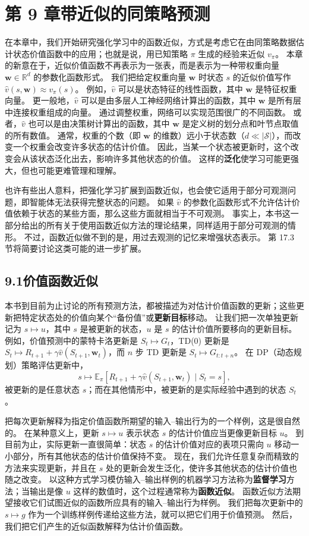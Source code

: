 \documentclass[UTF8, 12pt, fontset=fandol, oneside]{ctexart}
\begin{document}
\section*{第 9 章\quad 带近似的同策略预测}

在本章中，我们开始研究强化学习中的函数近似，方式是考虑它在由同策略数据估计状态价值函数中的应用；也就是说，用已知策略 $\pi$ 生成的经验来近似 $v_\pi$。
本章的新意在于，近似价值函数不再表示为一张表，而是表示为一种带权重向量 $\mathbf{w}\in\mathbb{R}^d$ 的参数化函数形式。
我们把给定权重向量 $\mathbf{w}$ 时状态 $s$ 的近似价值写作 $\hat{v}(s,\mathbf{w})\approx v_\pi(s)$。
例如，$\hat{v}$ 可以是状态特征的线性函数，其中 $\mathbf{w}$ 是特征权重向量。
更一般地，$\hat{v}$ 可以是由多层人工神经网络计算出的函数，其中 $\mathbf{w}$ 是所有层中连接权重组成的向量。
通过调整权重，网络可以实现范围很广的不同函数。
或者，$\hat{v}$ 也可以是由决策树计算出的函数，其中 $\mathbf{w}$ 是定义树的划分点和叶节点取值的所有数值。
通常，权重的个数（即 $\mathbf{w}$ 的维数）远小于状态数（$d\ll|\mathcal{S}|$），而改变一个权重会改变许多状态的估计价值。
因此，当某一个状态被更新时，这个改变会从该状态泛化出去，影响许多其他状态的价值。
这样的\textbf{泛化}使学习可能更强大，但也可能更难管理和理解。

也许有些出人意料，把强化学习扩展到函数近似，也会使它适用于部分可观测问题，即智能体无法获得完整状态的问题。
如果 $\hat{v}$ 的参数化函数形式不允许估计价值依赖于状态的某些方面，那么这些方面就相当于不可观测。
事实上，本书这一部分给出的所有关于使用函数近似方法的理论结果，同样适用于部分可观测的情形。
不过，函数近似做不到的是，用过去观测的记忆来增强状态表示。
第 17.3 节将简要讨论这类可能的进一步扩展。

\subsection*{9.1\quad 价值函数近似}

本书到目前为止讨论的所有预测方法，都被描述为对估计价值函数的更新；这些更新把特定状态处的价值向某个“备份值”或\textbf{更新目标}移动。
让我们把一次单独更新记为 $s\mapsto u$，其中 $s$ 是被更新的状态，$u$ 是 $s$ 的估计价值所要移向的更新目标。
例如，价值预测中的蒙特卡洛更新是 $S_t\mapsto G_t$，TD(0) 更新是 $S_t\mapsto R_{t+1}+\gamma\hat{v}(S_{t+1},\mathbf{w}_t)$，而 $n$ 步 TD 更新是 $S_t\mapsto G_{t:t+n}$。
在 DP（动态规划）策略评估更新中，
\[
s\mapsto \mathbb{E}_\pi\!\left[R_{t+1}+\gamma\hat{v}(S_{t+1},\mathbf{w}_t)\mid S_t=s\right],
\]
被更新的是任意状态 $s$；而在其他情形中，被更新的是实际经验中遇到的状态 $S_t$。

把每次更新解释为指定价值函数所期望的输入--输出行为的一个样例，这是很自然的。
在某种意义上，更新 $s\mapsto u$ 表示状态 $s$ 的估计价值应当更像更新目标 $u$。
到目前为止，实际更新一直很简单：状态 $s$ 的估计价值对应的表项只需向 $u$ 移动一小部分，所有其他状态的估计价值保持不变。
现在，我们允许任意复杂而精致的方法来实现更新，并且在 $s$ 处的更新会发生泛化，使许多其他状态的估计价值也随之改变。
以这种方式学习模仿输入--输出样例的机器学习方法称为\textbf{监督学习}方法；当输出是像 $u$ 这样的数值时，这个过程通常称为\textbf{函数近似}。
函数近似方法期望接收它们试图近似的函数所应具有的输入--输出行为样例。
我们把每次更新中的 $s\mapsto g$ 作为一个训练样例传递给这些方法，就可以把它们用于价值预测。
然后，我们把它们产生的近似函数解释为估计价值函数。
\end{document}
